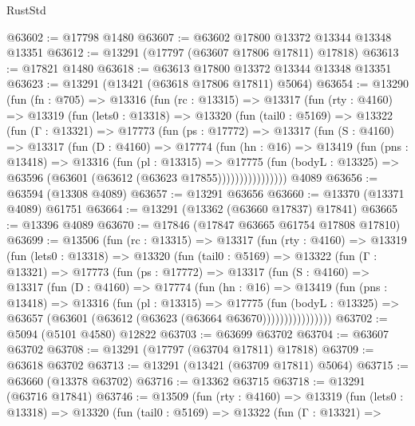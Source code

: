\begin{lexlean}{RustStd}
\begin{coremodule}
@63602 := @17798 @1480
@63607 := @63602 @17800 @13372 @13344 @13348 @13351
@63612 := @13291 (@17797 (@63607 @17806 @17811) @17818)
@63613 := @17821 @1480
@63618 := @63613 @17800 @13372 @13344 @13348 @13351
@63623 := @13291 (@13421 (@63618 @17806 @17811) @5064)
@63654 := @13290
    (fun (fn : @705) =>
    @13316
      (fun (rc : @13315) =>
      @13317
        (fun (rty : @4160) =>
        @13319
          (fun (lets0 : @13318) =>
          @13320
            (fun (tail0 : @5169) =>
            @13322
              (fun (Γ : @13321) =>
              @17773
                (fun (ps : @17772) =>
                @13317
                  (fun (S : @4160) =>
                  @13317
                    (fun (D : @4160) =>
                    @17774
                      (fun (hn : @16) =>
                      @13419
                        (fun (pns : @13418) =>
                        @13316
                          (fun (pl : @13315) =>
                          @17775
                            (fun (bodyL : @13325) =>
                            @63596 (@63601 (@63612 (@63623 @17855))))))))))))))))
    @4089
@63656 := @63594 (@13308 @4089)
@63657 := @13291 @63656
@63660 := @13370 (@13371 @4089) @61751
@63664 := @13291 (@13362 (@63660 @17837) @17841)
@63665 := @13396 @4089
@63670 := @17846 (@17847 @63665 @61754 @17808 @17810)
@63699 := @13506
    (fun (rc : @13315) =>
    @13317
      (fun (rty : @4160) =>
      @13319
        (fun (lets0 : @13318) =>
        @13320
          (fun (tail0 : @5169) =>
          @13322
            (fun (Γ : @13321) =>
            @17773
              (fun (ps : @17772) =>
              @13317
                (fun (S : @4160) =>
                @13317
                  (fun (D : @4160) =>
                  @17774
                    (fun (hn : @16) =>
                    @13419
                      (fun (pns : @13418) =>
                      @13316
                        (fun (pl : @13315) =>
                        @17775
                          (fun (bodyL : @13325) =>
                          @63657 (@63601 (@63612 (@63623 (@63664 @63670))))))))))))))))
@63702 := @5094 (@5101 @4580) @12822
@63703 := @63699 @63702
@63704 := @63607 @63702
@63708 := @13291 (@17797 (@63704 @17811) @17818)
@63709 := @63618 @63702
@63713 := @13291 (@13421 (@63709 @17811) @5064)
@63715 := @63660 (@13378 @63702)
@63716 := @13362 @63715
@63718 := @13291 (@63716 @17841)
@63746 := @13509
    (fun (rty : @4160) =>
    @13319
      (fun (lets0 : @13318) =>
      @13320
        (fun (tail0 : @5169) =>
        @13322
          (fun (Γ : @13321) =>

\end{coremodule}
\end{lexlean}
